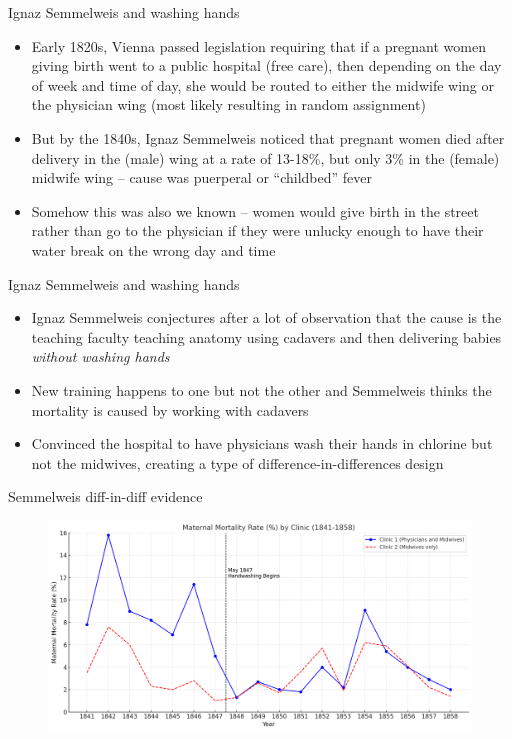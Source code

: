 \documentclass{beamer}
\begin{document}
\begin{frame}{Ignaz Semmelweis and washing hands}

\begin{itemize}
\item Early 1820s, Vienna passed legislation requiring that if a pregnant women giving birth went to a public hospital (free care), then depending on the day of week and time of day, she would be routed to either the midwife wing or the physician wing (most likely resulting in random assignment)
\item But by the 1840s, Ignaz Semmelweis noticed that pregnant women died after delivery in the (male) wing at a rate of 13-18\%, but only 3\% in the (female) midwife wing -- cause was puerperal or “childbed” fever
\item Somehow this was also we known -- women would give birth in the street rather than go to the physician if they were unlucky enough to have their water break on the wrong day and time
\end{itemize}

\end{frame}

\begin{frame}{Ignaz Semmelweis and washing hands}

\begin{itemize}
\item Ignaz Semmelweis conjectures after a lot of observation that the cause is the teaching faculty teaching anatomy using cadavers and then delivering babies \emph{without washing hands}
\item New training happens to one but not the other and Semmelweis thinks the mortality is caused by working with cadavers
\item Convinced the hospital to have physicians wash their hands in chlorine but not the midwives, creating a type of difference-in-differences design 
\end{itemize}

\end{frame}

\begin{frame}{Semmelweis diff-in-diff evidence}

	\begin{figure}
	\includegraphics[scale=0.4]{./lecture_includes/semmelweis_graphic.png}
	\end{figure}


\end{frame}
\end{document}
